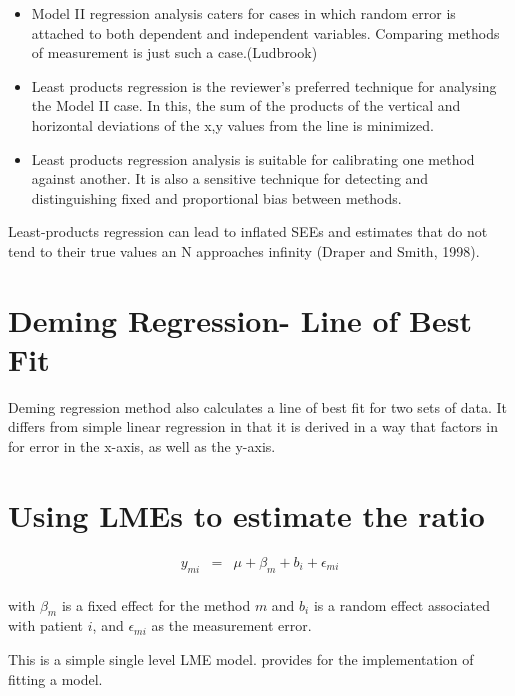 \documentclass[12pt, a4paper]{report}
\theoremstyle{plain}
\theoremstyle{definition}
\theoremstyle{remark}
\begin{document}
\begin{itemize}
	\item Model II regression analysis caters for cases in which random error is attached to both dependent and independent variables. Comparing methods of measurement is just such a case.(Ludbrook)
	
	\item Least products regression is the reviewer's preferred technique for analysing the Model II case. In this, the sum of the products of the vertical and horizontal deviations of the x,y values from the line is minimized.
	
	\item Least products regression analysis is suitable for calibrating one method against another. It is also a sensitive technique for detecting and distinguishing fixed and proportional bias between
	methods.
\end{itemize}

Least-products regression can lead to inflated SEEs and estimates that do not tend to their true values an N approaches infinity (Draper and Smith, 1998).








\section{Deming Regression- Line of Best Fit}


Deming regression method also calculates a line of best fit for two sets of data. It differs from simple linear regression in that it is derived in a way that factors in for error in the x-axis, as
well as the y-axis.




\section{Using LMEs to estimate the ratio}

\begin{eqnarray*}
	y_{mi} &=& \mu + \beta_{m} + b_{i} + \epsilon_{mi}\\
\end{eqnarray*}

with $\beta_{m}$ is a fixed effect for the method $m$ and $b_{i}$
is a random effect associated with patient $i$, and
$\epsilon_{mi}$ as the measurement error.

This is a simple single level LME model. \citet{pb} provides for
the implementation of fitting a model.
\end{document}

